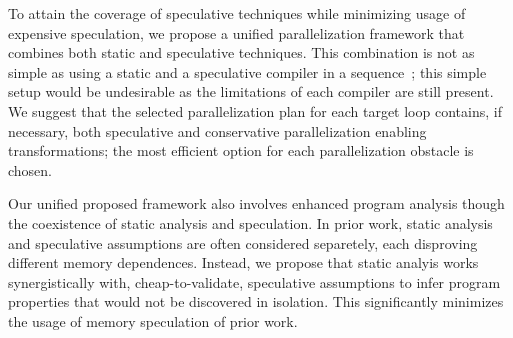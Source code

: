 To attain the coverage of speculative techniques while minimizing usage of
expensive speculation,
we propose a unified parallelization framework that combines both static and
speculative techniques.
This combination is not as simple as using a static and a speculative compiler
in a sequence~\cite{kim:12:cgo}; this simple setup would be undesirable as
the limitations of each compiler are still present.
%
We suggest that the selected parallelization plan for each target loop contains,
if necessary, both speculative and conservative parallelization enabling
transformations; the most efficient option for each parallelization obstacle is
chosen.
%
%

Our unified proposed framework also involves enhanced program analysis though
the coexistence of static analysis and speculation. In prior work, static
analysis and speculative assumptions are often considered separetely, each
disproving different memory dependences. Instead, we propose that static analyis
works synergistically with, cheap-to-validate, speculative assumptions to infer
program properties that would not be discovered in isolation. This significantly
minimizes the usage of memory speculation of prior work.




